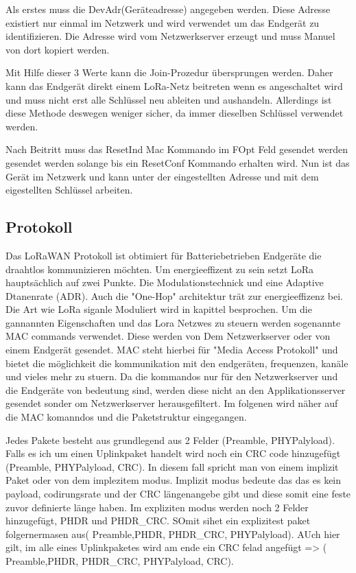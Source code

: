 \documentclass[a4paper,12pt]{article}
\begin{document}
                Als erstes muss die DevAdr(Geräteadresse) angegeben werden. Diese Adresse existiert nur einmal im 
                Netzwerk und wird verwendet um das Endgerät zu identifizieren. Die Adresse wird vom Netzwerkserver 
                erzeugt und muss Manuel von dort kopiert werden. 

                Mit Hilfe dieser 3 Werte kann die Join-Prozedur übersprungen werden. Daher kann 
                das Endgerät direkt einem LoRa-Netz beitreten wenn es angeschaltet wird und muss nicht erst alle 
                Schlüssel neu ableiten und aushandeln. Allerdings ist diese Methode deswegen weniger sicher, da immer 
                dieselben Schlüssel verwendet werden.

                Nach Beitritt muss das ResetInd Mac Kommando im FOpt Feld gesendet werden gesendet werden solange bis 
                ein ResetConf Kommando erhalten wird. Nun ist das Gerät im Netzwerk und kann unter der eingestellten 
                Adresse und mit dem eigestellten Schlüssel arbeiten.\cite[S. 64]{LoRaSpec}    
        \subsection{Protokoll} \label{sec:protokoll}
            Das LoRaWAN Protokoll ist obtimiert für Batteriebetrieben Endgeräte die draahtlos kommunizieren möchten. Um energieeffizent zu sein setzt LoRa hauptsächlich auf zwei Punkte. Die Modulationstechnick und eine Adaptive Dtanenrate (ADR). Auch die 
            "One-Hop" architektur trät zur energieeffizenz bei. Die Art wie LoRa siganle Moduliert wird in kapittel  besprochen. Um die gannannten Eigenschaften und das Lora Netzwes zu steuern werden sogenannte MAC commands verwendet. 
            Diese werden von Dem Netzwerkserver oder von einem Endgerät gesendet. MAC steht hierbei für "Media Access Protokoll" und bietet die möglichkeit die kommunikation mit den endgeräten, frequenzen, kanäle und vieles mehr zu stuern. 
            Da die kommandos nur für den Netzwerkserver und die Endgeräte von bedeutung sind, werden diese nicht an den Applikationsserver gesendet sonder om Netzwerkserver herausgefiltert. Im folgenen wird näher auf die MAC komanndos und die Paketstruktur eingegangen.

            Jedes Pakete besteht aus grundlegend aus 2 Felder (Preamble,  PHYPalyload).  Falls es ich um einen Uplinkpaket handelt wird noch ein CRC code hinzugefügt   (Preamble,  PHYPalyload, CRC). 
            In diesem fall spricht man von einem implizit Paket oder von dem implezitem modus. Implizit modus bedeute das das es kein payload, codirungsrate und der CRC längenangebe gibt und diese somit eine feste zuvor definierte länge haben. Im expliziten modus werden noch 2 Felder hinzugefügt, 
            PHDR und PHDR\_CRC. SOmit sihet ein explizitest paket folgernermasen aus( Preamble,PHDR, PHDR\_CRC, PHYPalyload). AUch hier gilt, im alle eines Uplinkpaketes wird am ende ein CRC felad angefügt => ( Preamble,PHDR, PHDR\_CRC, PHYPalyload, CRC).
            
\end{document}
